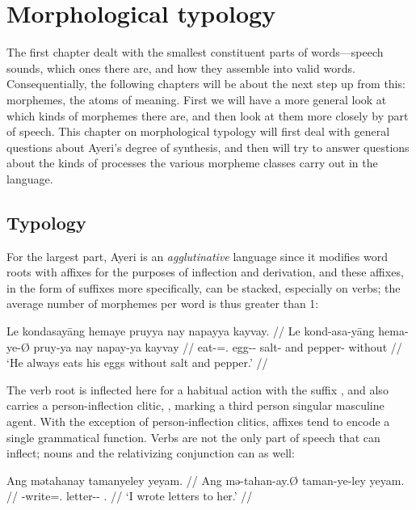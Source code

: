 
\chapter{Morphological typology}

The first chapter dealt with the smallest constituent parts of words---speech 
sounds, which ones there are, and how they assemble into valid words. 
Consequentially, the following chapters will be about the next step up from 
this: morphemes, the atoms of meaning. First we will have a more general look 
at which kinds of morphemes there are, and then look at them more closely by 
part of speech. This chapter on morphological typology will first deal with 
general questions about Ayeri's degree of synthesis, and then will try 
to answer questions about the kinds of processes the various morpheme classes 
carry out in the language.

\section{Typology}

For the largest part, Ayeri is an \emph{agglutinative} 
language since it modifies word roots with affixes for the purposes of 
inflection and derivation, and these affixes, in the form of 
suffixes more specifically, can be stacked, especially on 
verbs; the average number of morphemes per word is thus greater than 1:

\ex\begingl
	\gla Le kondasayāng hemaye pruyya nay napayya kayvay. //
	\glb Le kond-asa-yāng hema-ye-Ø pruy-ya nay napay-ya kayvay //
	\glc \PatTI{} eat-\Hab{}=\TsgM{}.\Aarg{} egg-\Pl{}-\Top{} salt-\Loc{} 
		and pepper-\Loc{} without //
	\glft `He always eats his eggs without salt and pepper.' //
\endgl\xe

The verb root  is inflected here for a habitual action 
with the suffix , and also carries a person-inflection 
clitic, , marking a third person singular 
masculine agent. With the exception of person-inflection clitics, affixes tend 
to encode a single grammatical function. Verbs are not the only part of speech 
that can inflect; nouns and the relativizing conjunction can as well:

\pex
\a\label{ex:letters}\begingl
	\gla Ang mətahanay tamanyeley yeyam. //
	\glb Ang mə-tahan-ay.Ø taman-ye-ley yeyam. //
	\glc \AgtT{} \Pst{}-write=\Fsg{}.\Top{} letter-\Pl{}-\PargI{} 
		\TsgF{}.\Dat{} //
	\glft `I wrote letters to her.' //
\endgl

